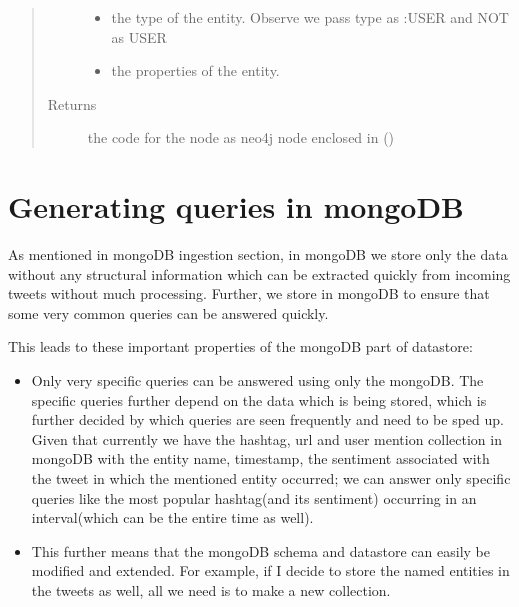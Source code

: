 \documentclass[letterpaper,10pt,english]{sphinxmanual}
\begin{document}
\begin{fulllineitems}
\begin{fulllineitems}
\begin{quote}
\begin{description}
\begin{itemize}
\item {} 
 \textendash{} the type of the entity. Observe we pass type as :USER and NOT as USER

\item {} 
 \textendash{} the properties of the entity.

\end{itemize}

\item[{Returns}] \leavevmode
the code for the node as neo4j node enclosed in ()

\end{description}\end{quote}

\end{fulllineitems}


\end{fulllineitems}



\chapter{Generating queries in mongoDB}
\label{\detokenize{mongoDB_query_generation:generating-queries-in-mongodb}}\label{\detokenize{mongoDB_query_generation::doc}}
As mentioned in mongoDB ingestion section, in mongoDB we store only the data without any structural information which can be extracted quickly from incoming tweets without much processing. Further, we store in mongoDB to ensure that some very common queries can be answered quickly.

This leads to these important properties of the mongoDB part of datastore:
\begin{itemize}
\item {} 
Only very specific queries can be answered using only the mongoDB. The specific queries further depend on the data which is being stored, which is further decided by which queries are seen frequently and need to be sped up. Given that currently we have the hashtag, url and user mention collection in mongoDB with the entity name, timestamp, the sentiment associated with the tweet in which the mentioned entity occurred; we can answer only specific queries like the most popular hashtag(and its sentiment) occurring in an interval(which can be the entire time as well).

\item {} 
This further means that the mongoDB schema and datastore can easily be modified and extended. For example, if I decide to store the named entities in the tweets as well, all we need is to make a new collection.

\end{itemize}
\end{document}
